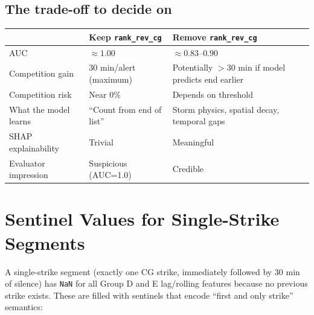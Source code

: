 \documentclass[12pt,a4paper]{article}
\begin{document}
\subsection{The trade-off to decide on}

\begin{center}
\begin{tabular}{L{3cm} L{5.5cm} L{5.5cm}}
\toprule
& \textbf{Keep \texttt{rank\_rev\_cg}} & \textbf{Remove \texttt{rank\_rev\_cg}} \\
\midrule
AUC & $\approx 1.00$ & $\approx 0.83$--$0.90$ \\
Competition gain & 30 min/alert (maximum) & Potentially $> 30$ min if model predicts end earlier \\
Competition risk & Near 0\% & Depends on threshold \\
What the model learns & ``Count from end of list'' & Storm physics, spatial decay, temporal gaps \\
SHAP explainability & Trivial & Meaningful \\
Evaluator impression & Suspicious (AUC=1.0) & Credible \\
\bottomrule
\end{tabular}
\end{center}

\newpage

\section{Sentinel Values for Single-Strike Segments}

A single-strike segment (exactly one CG strike, immediately followed by 30 min of silence) has \texttt{NaN} for all Group D and E lag/rolling features because no previous strike exists. These are filled with sentinels that encode ``first and only strike'' semantics:
\end{document}
